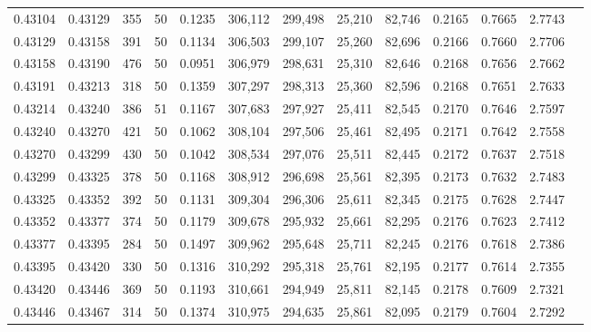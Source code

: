\begin{tabular}{rrrrrrrrrrrrr}
0.43104 & 0.43129 &   355 &  50 &                                     0.1235 & 306,112 & 299,498 &  25,210 &  82,746 & 0.2165 & 0.7665 & 2.7743 \\
0.43129 & 0.43158 &   391 &  50 &                                     0.1134 & 306,503 & 299,107 &  25,260 &  82,696 & 0.2166 & 0.7660 & 2.7706 \\
0.43158 & 0.43190 &   476 &  50 &                                     0.0951 & 306,979 & 298,631 &  25,310 &  82,646 & 0.2168 & 0.7656 & 2.7662 \\
0.43191 & 0.43213 &   318 &  50 &                                     0.1359 & 307,297 & 298,313 &  25,360 &  82,596 & 0.2168 & 0.7651 & 2.7633 \\
0.43214 & 0.43240 &   386 &  51 &                                     0.1167 & 307,683 & 297,927 &  25,411 &  82,545 & 0.2170 & 0.7646 & 2.7597 \\
0.43240 & 0.43270 &   421 &  50 &                                     0.1062 & 308,104 & 297,506 &  25,461 &  82,495 & 0.2171 & 0.7642 & 2.7558 \\
0.43270 & 0.43299 &   430 &  50 &                                     0.1042 & 308,534 & 297,076 &  25,511 &  82,445 & 0.2172 & 0.7637 & 2.7518 \\
0.43299 & 0.43325 &   378 &  50 &                                     0.1168 & 308,912 & 296,698 &  25,561 &  82,395 & 0.2173 & 0.7632 & 2.7483 \\
0.43325 & 0.43352 &   392 &  50 &                                     0.1131 & 309,304 & 296,306 &  25,611 &  82,345 & 0.2175 & 0.7628 & 2.7447 \\
0.43352 & 0.43377 &   374 &  50 &                                     0.1179 & 309,678 & 295,932 &  25,661 &  82,295 & 0.2176 & 0.7623 & 2.7412 \\
0.43377 & 0.43395 &   284 &  50 &                                     0.1497 & 309,962 & 295,648 &  25,711 &  82,245 & 0.2176 & 0.7618 & 2.7386 \\
0.43395 & 0.43420 &   330 &  50 &                                     0.1316 & 310,292 & 295,318 &  25,761 &  82,195 & 0.2177 & 0.7614 & 2.7355 \\
0.43420 & 0.43446 &   369 &  50 &                                     0.1193 & 310,661 & 294,949 &  25,811 &  82,145 & 0.2178 & 0.7609 & 2.7321 \\
0.43446 & 0.43467 &   314 &  50 &                                     0.1374 & 310,975 & 294,635 &  25,861 &  82,095 & 0.2179 & 0.7604 & 2.7292 \\

\end{tabular}
